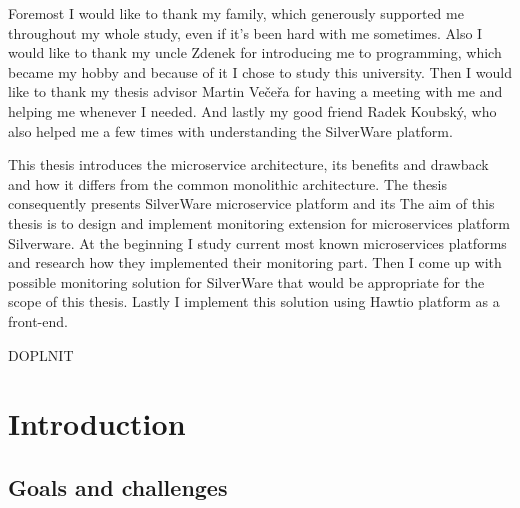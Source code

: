 \documentclass[12pt,oneside]{fithesis2}
\begin{document}
  \FrontMatter                    %
    \ThesisTitlePage                %
    \begin{ThesisDeclaration}       %
      \DeclarationText
      \AdvisorName
    \end{ThesisDeclaration}
    \begin{ThesisThanks}            %
      Foremost I would like to thank my family, which generously supported me throughout my whole study, even if it's been hard with me sometimes. Also I would like to thank my uncle Zdenek for introducing me to programming, which became my hobby and because of it I chose to study this university. Then I would like to thank my thesis advisor Martin Večeřa for having a meeting with me and helping me whenever I needed. And lastly my good friend Radek Koubský, who also helped me a few times with understanding the SilverWare platform.
    \end{ThesisThanks}
    \begin{ThesisAbstract}          %
This thesis introduces the microservice architecture, its benefits and drawback and how it differs from the common monolithic architecture. The thesis consequently presents SilverWare microservice platform and its 
The aim of this thesis is to design and implement monitoring extension for microservices platform Silverware. At the beginning I study current most known microservices platforms and research how they implemented their monitoring part. Then I come up with possible monitoring solution for SilverWare that would be appropriate for the scope of this thesis. Lastly I implement this solution using Hawtio platform as a front-end.
    \end{ThesisAbstract}
    \begin{ThesisKeyWords}          %
      DOPLNIT
    \end{ThesisKeyWords}
    \tableofcontents                %
  
  \MainMatter                     %
\chapter{Introduction}

\section{Goals and challenges}
\end{document}
